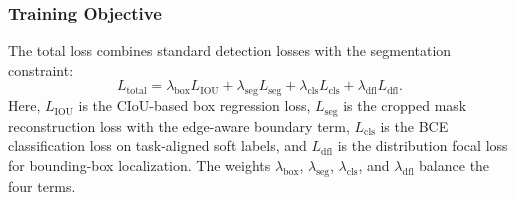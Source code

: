 \subsubsection{Training Objective}
The total loss combines standard detection losses with the segmentation constraint:
\begin{equation}
L_{\text{total}}=\lambda_{\text{box}}L_{\text{IOU}}+\lambda_{\text{seg}}L_{\text{seg}}+\lambda_{\text{cls}}L_{\text{cls}}+\lambda_{\text{dfl}}L_{\text{dfl}}.
\label{eq:loss}
\end{equation}
Here, $L_{\text{IOU}}$ is the CIoU-based box regression loss, $L_{\text{seg}}$ is the cropped mask reconstruction loss with the edge-aware boundary term, $L_{\text{cls}}$ is the BCE classification loss on task-aligned soft labels, and $L_{\text{dfl}}$ is the distribution focal loss for bounding-box localization. The weights $\lambda_{\text{box}}$, $\lambda_{\text{seg}}$, $\lambda_{\text{cls}}$, and $\lambda_{\text{dfl}}$ balance the four terms.

